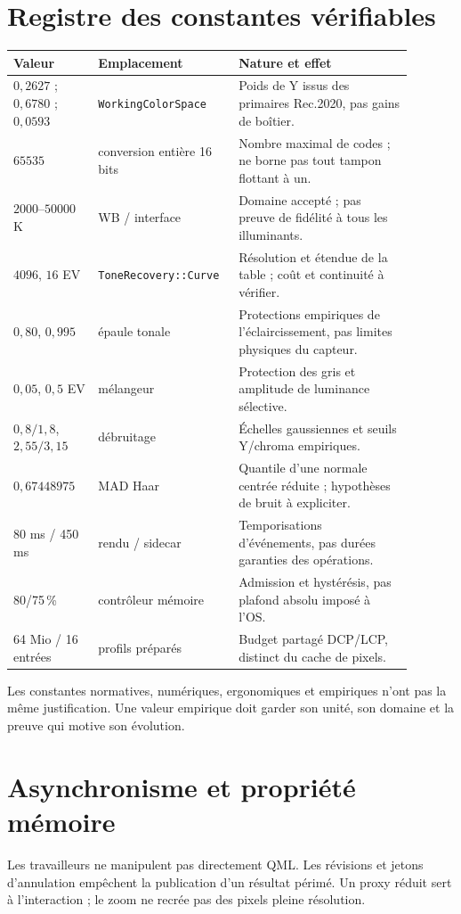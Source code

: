 \section{Registre des constantes vérifiables}
\begin{longtable}{p{0.20\linewidth}p{0.28\linewidth}p{0.41\linewidth}}
\toprule Valeur & Emplacement & Nature et effet \\\midrule\endhead
$0{,}2627$ ; $0{,}6780$ ; $0{,}0593$ & \texttt{WorkingColorSpace} & Poids de Y issus des primaires Rec.2020, pas gains de boîtier. \\
$65535$ & conversion entière 16 bits & Nombre maximal de codes ; ne borne pas tout tampon flottant à un. \\
$2000$--$50000$ K & WB / interface & Domaine accepté ; pas preuve de fidélité à tous les illuminants. \\
$4096$, $16$ EV & \texttt{ToneRecovery::Curve} & Résolution et étendue de la table ; coût et continuité à vérifier. \\
$0{,}80$, $0{,}995$ & épaule tonale & Protections empiriques de l'éclaircissement, pas limites physiques du capteur. \\
$0{,}05$, $0{,}5$ EV & mélangeur & Protection des gris et amplitude de luminance sélective. \\
$0{,}8/1{,}8$, $2{,}55/3{,}15$ & débruitage & Échelles gaussiennes et seuils Y/chroma empiriques. \\
$0{,}67448975$ & MAD Haar & Quantile d'une normale centrée réduite ; hypothèses de bruit à expliciter. \\
80 ms / 450 ms & rendu / sidecar & Temporisations d'événements, pas durées garanties des opérations. \\
80/75\,\% & contrôleur mémoire & Admission et hystérésis, pas plafond absolu imposé à l'OS. \\
64 Mio / 16 entrées & profils préparés & Budget partagé DCP/LCP, distinct du cache de pixels. \\
\bottomrule
\end{longtable}
Les constantes normatives, numériques, ergonomiques et empiriques n'ont pas
la même justification. Une valeur empirique doit garder son unité, son
domaine et la preuve qui motive son évolution.

\section{Asynchronisme et propriété mémoire}
Les travailleurs ne manipulent pas directement QML. Les révisions et jetons
d'annulation empêchent la publication d'un résultat périmé. Un proxy réduit
sert à l'interaction ; le zoom ne recrée pas des pixels pleine résolution.

